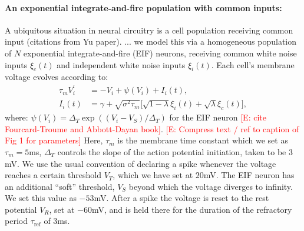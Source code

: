\documentclass[%
 reprint,
 twocolumn,
 amsmath,amssymb,
 aps,
floatfix,
]{revtex4}
\newcommand{\Ecomment}[1]{\textcolor{red}{[E: #1]}}
\begin{document}
  


\bigskip

\noindent \paragraph*{An exponential integrate-and-fire population with common inputs:}

A ubiquitous situation in neural circuitry is a cell population receiving common input (citations from Yu paper). ... we model this via a homogeneous population of $N$ exponential integrate-and-fire (EIF) neurons, receiving common white noise inputs $\xi_c(t)$ and independent white noise inputs $\xi_i(t)$.  Each cell's membrane voltage evolves according to: 
\begin{align}
\label{eifsde}
\tau_m V_i^\prime &= -V_i +\psi(V_i)+I_i(t),\\
I_i(t) &= \gamma+\sqrt{\sigma^2\tau_m}\big[\sqrt{1-\lambda}\xi_i(t)+\sqrt{\lambda}\xi_c(t)\big] \nonumber,
\end{align}
where: $\psi(V_i) =\Delta_T \exp{\left((V_i - V_S)/\Delta_T\right)}$ for the EIF neuron \Ecomment{cite Fourcard-Troume and Abbott-Dayan book}.  \Ecomment{Compress text / ref to caption of Fig 1 for parameters} Here, $\tau_m$ is the membrane time constant which we set as $\tau_m = 5$ms, $\Delta_T$ controls the slope of the action potential initiation, taken to be $3$mV. We use the usual convention of declaring a spike whenever the voltage reaches a certain threshold $V_T$, which we have set at $20$mV. The EIF neuron has an additional ``soft'' threshold, $V_S$ beyond which the voltage diverges to infinity. We set this value as $-53$mV. After a spike the voltage is reset to the rest potential $V_R$, set at $-60$mV, and is held there for the duration of the refractory period $\tau_{\text{ref}}$ of $3$ms.
\end{document}
